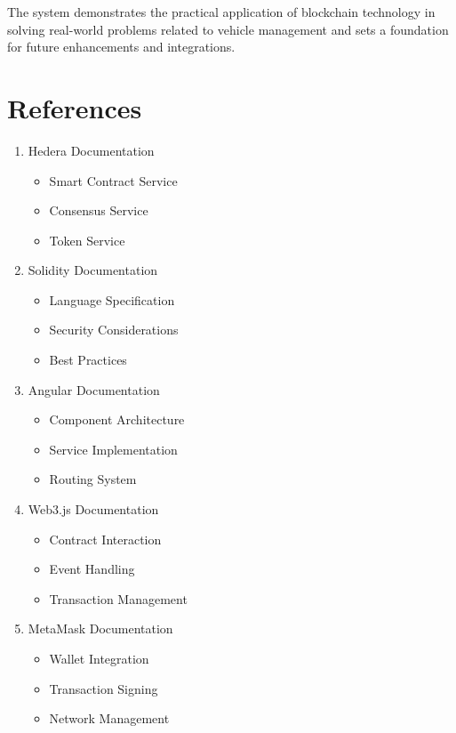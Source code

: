 \documentclass[12pt,a4paper]{article}
\begin{document}
    The system demonstrates the practical application of blockchain technology in solving real-world problems related to vehicle management and sets a foundation for future enhancements and integrations.


    \section{References}
    \begin{enumerate}
        \item Hedera Documentation
        \begin{itemize}
            \item Smart Contract Service
            \item Consensus Service
            \item Token Service
        \end{itemize}

        \item Solidity Documentation
        \begin{itemize}
            \item Language Specification
            \item Security Considerations
            \item Best Practices
        \end{itemize}

        \item Angular Documentation
        \begin{itemize}
            \item Component Architecture
            \item Service Implementation
            \item Routing System
        \end{itemize}

        \item Web3.js Documentation
        \begin{itemize}
            \item Contract Interaction
            \item Event Handling
            \item Transaction Management
        \end{itemize}

        \item MetaMask Documentation
        \begin{itemize}
            \item Wallet Integration
            \item Transaction Signing
            \item Network Management
        \end{itemize}
    \end{enumerate}
\end{document}
